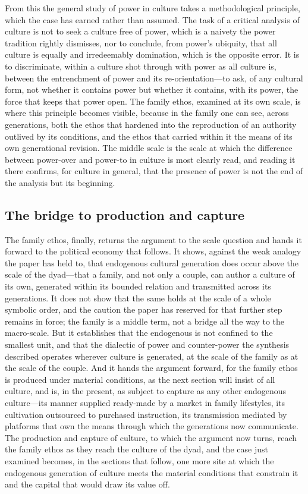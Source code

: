 From this the general study of power in culture takes a methodological principle, which the case has earned rather than assumed. The task of a critical analysis of culture is not to seek a culture free of power, which is a naivety the power tradition rightly dismisses, nor to conclude, from power's ubiquity, that all culture is equally and irredeemably domination, which is the opposite error. It is to discriminate, within a culture shot through with power as all culture is, between the entrenchment of power and its re-orientation---to ask, of any cultural form, not whether it contains power but whether it contains, with its power, the force that keeps that power open. The family ethos, examined at its own scale, is where this principle becomes visible, because in the family one can see, across generations, both the ethos that hardened into the reproduction of an authority outlived by its conditions, and the ethos that carried within it the means of its own generational revision. The middle scale is the scale at which the difference between power-over and power-to in culture is most clearly read, and reading it there confirms, for culture in general, that the presence of power is not the end of the analysis but its beginning.

\subsection*{The bridge to production and capture}

The family ethos, finally, returns the argument to the scale question and hands it forward to the political economy that follows. It shows, against the weak analogy the paper has held to, that endogenous cultural generation does occur above the scale of the dyad---that a family, and not only a couple, can author a culture of its own, generated within its bounded relation and transmitted across its generations. It does not show that the same holds at the scale of a whole symbolic order, and the caution the paper has reserved for that further step remains in force; the family is a middle term, not a bridge all the way to the macro-scale. But it establishes that the endogenous is not confined to the smallest unit, and that the dialectic of power and counter-power the synthesis described operates wherever culture is generated, at the scale of the family as at the scale of the couple. And it hands the argument forward, for the family ethos is produced under material conditions, as the next section will insist of all culture, and is, in the present, as subject to capture as any other endogenous culture---its manner supplied ready-made by a market in family lifestyles, its cultivation outsourced to purchased instruction, its transmission mediated by platforms that own the means through which the generations now communicate. The production and capture of culture, to which the argument now turns, reach the family ethos as they reach the culture of the dyad, and the case just examined becomes, in the sections that follow, one more site at which the endogenous generation of culture meets the material conditions that constrain it and the capital that would draw its value off.
